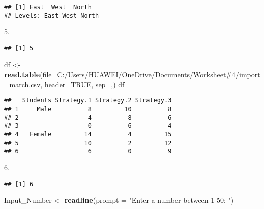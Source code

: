 \documentclass[
]{article}
\newenvironment{Shaded}{\begin{snugshade}}{\end{snugshade}}
\newcommand{\AttributeTok}[1]{\textcolor[rgb]{0.13,0.29,0.53}{#1}}
\newcommand{\ConstantTok}[1]{\textcolor[rgb]{0.56,0.35,0.01}{#1}}
\newcommand{\FloatTok}[1]{\textcolor[rgb]{0.00,0.00,0.81}{#1}}
\newcommand{\FunctionTok}[1]{\textcolor[rgb]{0.13,0.29,0.53}{\textbf{#1}}}
\newcommand{\NormalTok}[1]{#1}
\newcommand{\OtherTok}[1]{\textcolor[rgb]{0.56,0.35,0.01}{#1}}
\newcommand{\StringTok}[1]{\textcolor[rgb]{0.31,0.60,0.02}{#1}}
\begin{document}
\begin{verbatim}
## [1] East  West  North
## Levels: East West North
\end{verbatim}

\begin{Shaded}
\begin{Highlighting}[]
\FloatTok{5.}
\end{Highlighting}
\end{Shaded}

\begin{verbatim}
## [1] 5
\end{verbatim}

\begin{Shaded}
\begin{Highlighting}[]
\NormalTok{df }\OtherTok{\textless{}{-}} \FunctionTok{read.table}\NormalTok{(}\AttributeTok{file=}\StringTok{\textquotesingle{}C:/Users/HUAWEI/OneDrive/Documents/Worksheet\#4/import\_march.csv\textquotesingle{}}\NormalTok{, }\AttributeTok{header=}\ConstantTok{TRUE}\NormalTok{, }\AttributeTok{sep=}\StringTok{\textquotesingle{},\textquotesingle{}}\NormalTok{)}
\NormalTok{df}
\end{Highlighting}
\end{Shaded}

\begin{verbatim}
##   Students Strategy.1 Strategy.2 Strategy.3
## 1     Male          8         10          8
## 2                   4          8          6
## 3                   0          6          4
## 4   Female         14          4         15
## 5                  10          2         12
## 6                   6          0          9
\end{verbatim}

\begin{Shaded}
\begin{Highlighting}[]
\FloatTok{6.}
\end{Highlighting}
\end{Shaded}

\begin{verbatim}
## [1] 6
\end{verbatim}

\begin{Shaded}
\begin{Highlighting}[]
\NormalTok{Input\_Number }\OtherTok{\textless{}{-}} \FunctionTok{readline}\NormalTok{(}\AttributeTok{prompt =} \StringTok{"Enter a number between 1{-}50: "}\NormalTok{)}
\end{Highlighting}
\end{Shaded}
\end{document}
